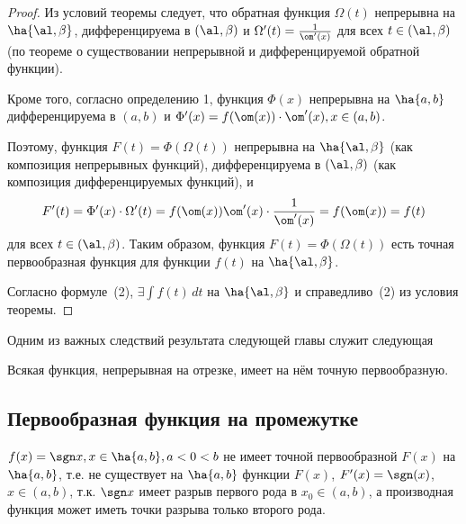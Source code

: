 \documentclass[a4paper]{article}
\begin{document}
\begin{proof}
  Из условий теоремы следует, что обратная функция $\Omega(t)$
  непрерывна на $\ha{\al,\beta}$, дифференцируема в $(\al,\beta)$ и
  $\Omega'(t)=\frac{1}{\om'(x)}$ для всех $t\in(\al,\beta)$
  (по теореме о существовании непрерывной и дифференцируемой
  обратной функции).

  Кроме того, согласно определению 1, функция $\Phi(x)$ непрерывна на
  $\ha{a,b}$ дифференцируема в $(a,b)$ и
  $\Phi'(x)=f(\om(x))\cdot\om'(x), x\in(a,b)$.

  Поэтому, функция $F(t)=\Phi(\Omega(t))$ непрерывна на
  $\ha{\al,\beta}$ (как композиция непрерывных функций),
  дифференцируема в $(\al,\beta)$ (как композиция
  дифференцируемых функций), и
$$F'(t)=\Phi'(x)\cdot\Omega'(t)=f(\om(x))\om'(x)\cdot\frac{1}{\om'(x)}=  f(\om(x))=f(t)$$
для всех $t\in(\al,\beta)$. Таким образом,
  функция $F(t)=\Phi(\Omega(t))$ есть точная первообразная функция
  для функции $f(t)$ на $\ha{\al,\beta}$.

  Согласно формуле~(2), $\exists \int f(t) \,dt$ на
  $\ha{\al,\beta}$ и справедливо~(2) из условия теоремы.
\end{proof}

Одним из важных следствий результата следующей главы служит следующая
\begin{theorem}
Всякая функция, непрерывная на отрезке, имеет на нём точную первообразную.
\end{theorem}

\subsection{Первообразная функция на промежутке}
$f(x)=\sgn x, x\in\ha{a,b}, a<0<b$ не имеет точной первообразной
$F(x)$ на $\ha{a,b}$, т.е. не существует на $\ha{a,b}$ функции
$F(x)$, $F'(x)=\sgn(x)$, $x\in(a,b)$, т.к. $\sgn x$ имеет разрыв
первого рода в $x_0 \in (a,b)$, а производная функция может иметь
точки разрыва только второго рода.
\end{document}

